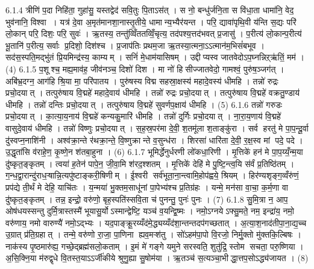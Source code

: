 6.1.4
त्रीणि॑ प॒दा निहि॑ता॒ गुहा॑सु॒ यस्तद्वेद॑ सवि॒तुः पि॒ताऽस॑त् । स नो॒ बन्धु॑र्जनि॒ता स वि॑धा॒ता धामा॑नि॒ वेद॒ भुव॑नानि॒ विश्वा । यत्र॑ दे॒वा अ॒मृत॑मानशा॒नास्तृ॒तीये॒ धामान्य॒भ्यैर॑यन्त । परि॒ द्यावा॑पृथि॒वी य॑न्ति स॒द्यः परि॑ लो॒कान् परि॒ दिशः॒ परि॒ सुवः॑ । ऋ॒तस्य॒ तन्तु॑व्विँततव्विँ॒चृत्य॒ तद॑पश्य॒त्तद॑भवत् प्र॒जासु॑ । प॒रीत्य॑ लो॒कान्प॒रीत्य॑ भू॒तानि॑ प॒रीत्य॒ सर्वाः प्र॒दिशो॒ दिश॑श्च । प्र॒जाप॑तिः प्रथम॒जा ऋ॒तस्या॒त्मना॒ऽऽत्मान॑म॒भिसं॑बभूव । सद॑स॒स्पति॒मद्भु॑तं प्रि॒यमिन्द्र॑स्य॒ काम्यम् । सनिं॑ मे॒धाम॑यासिषम् । उद्दीप्यस्व जातवेदोऽप॒घ्नन्निऱ्ऋ॑तिं॒ मम॑ । (4)
6.1.5
प॒शूश्च॒ मह्य॒माव॑ह॒ जीव॑नञ्च॒ दिशो॑ दिश । मा नो॑ हिसीज्जातवेदो॒ गामश्वं॒ पुरु॑ष॒ञ्जग॑त् । अबि॑भ्र॒दग्न॒ आग॑हि श्रि॒या मा॒ परि॑पातय । पुरु॑षस्य विद्म सहस्रा॒क्षस्य॑ महादे॒वस्य॑ धीमहि । तन्नो॑ रुद्रः प्रचो॒दयात् । तत्पुरु॑षाय वि॒द्महे॑ महादे॒वाय॑ धीमहि । तन्नो॑ रुद्रः प्रचो॒दयात् । तत्पुरु॑षाय वि॒द्महे॑ वक्रतु॒ण्डाय॑ धीमहि । तन्नो॑ दन्तिः प्रचो॒दयात् । तत्पुरु॑षाय वि॒द्महे॑ सुवर्णप॒क्षाय॑ धीमहि । (5)
6.1.6
तन्नो॑ गरुडः प्रचो॒दयात् । का॒त्या॒य॒नाय॑ वि॒द्महे॑ कन्यकु॒मारि॑ धीमहि । तन्नो॑ दुर्गिः प्रचो॒दयात् । ना॒रा॒य॒णाय॑ वि॒द्महे॑ वासुदे॒वाय॑ धीमहि । तन्नो॑ विष्णुः प्रचो॒दयात् । स॒ह॒स्र॒पर॑मा दे॒वी॒ श॒तमू॑ला श॒ताङ्कु॑रा । सर्व हरतु॑ मे पा॒प॒न्दू॒र्वा दु॑स्वप्न॒नाशि॑नी । अश्व॑क्रा॒न्ते र॑थक्रा॒न्ते॒ वि॒ष्णुक्रान्ते व॒सुन्ध॑रा । शिरसा॑ धारि॑ता दे॒वी॒ र॒क्ष॒स्व मां पदे॒ पदे । उ॒द्धृता॑सि व॑राहे॒ण॒ कृ॒ष्णे॒न श॑तबा॒हुना । (6)
6.1.7
भूमिर्द्धेनुर्धरणी लो॑कधा॒रिणी । मृ॒त्तिके॑ हन॑ मे पा॒प॒य्यँ॒न्म॒या दु॑ष्कृत॒ङ्कृतम् । त्वया॑ ह॒तेन॑ पापे॒न॒ जी॒वा॒मि श॑रद॒श्शतम् । मृ॒त्तिके॑ देहि॑ मे पु॒ष्टि॒न्त्व॒यि स॑र्वं प्र॒तिष्ठि॑तम् । ग॒न्ध॒द्वा॒रान्दु॑राध॒ऱ्षान्नि॒त्यपु॑ष्टाङ्करी॒षिणीम् । ई॒श्वरी सर्व॑भूता॒ना॒न्त्वामि॒होप॑ह्वये॒ श्रियम् । हिर॑ण्यशृङ्ग॒व्वँरु॑णं॒ प्रप॑द्ये ती॒र्थं मे देहि॒ याचि॑तः । य॒न्मया॑ भु॒क्तम॒साधू॑नां पा॒पेभ्य॑श्च प्र॒तिग्र॑हः । यन्मे॒ मन॑सा वा॒चा॒ क॒र्म॒णा वा दु॑ष्कृत॒ङ्कृतम् । तन्न॒ इन्द्रो॒ वरु॑णो॒ बृह॒स्पति॑स्सवि॒ता च॑ पुनन्तु॒ पुनः॑ पुनः । (7)
6.1.8
सु॒मि॒त्रा न॒ आप॒ ओष॑धयस्सन्तु दुर्मि॒त्रास्तस्मै॑ भूयासु॒र्योऽस्मान्द्वेष्टि॒ यञ्च॑ व॒यन्द्वि॒ष्मः । नमो॒ऽग्नयेऽफ्सु॒मते॒ नम॒ इन्द्रा॑य॒ नमो॒ वरु॑णाय॒ नमो वारुण्यै॑ नमो॒ऽद्भ्यः । यद॒पाङ्क्रू॒रय्यँद॑मे॒द्ध्यय्यँद॑शा॒न्तन्तदप॑गच्छतात् । अ॒त्या॒श॒नाद॑तीपा॒ना॒द्य॒च्च उ॒ग्रात् प्र॑ति॒ग्रहात् । तन्मे॒ वरु॑णो रा॒जा॒ पा॒णिना ह्यव॒मऱ्श॑तु । सो॑ऽहम॑पा॒पो वि॒रजो॒ निर्मु॒क्तो मु॑क्तकि॒ल्बिषः । नाक॑स्य पृ॒ष्ठमारु॑ह्य॒ गच्छे॒द्ब्रह्म॑सलो॒कताम् । इ॒मं मे॑ गङ्गे यमुने सरस्वति॒ शुतु॑द्रि॒ स्तोम सचता॒ परु॒ष्णिया । अ॒सि॒क्नि॒या म॑रुद्वृधे वि॒तस्त॒याऽऽर्जी॑कीये श्रुणु॒ह्या सु॒षोम॑या । ऋ॒तञ्च॑ स॒त्यञ्चा॒भीद्धा॒त्तप॒सोऽद्ध्य॑जायत । (8)
